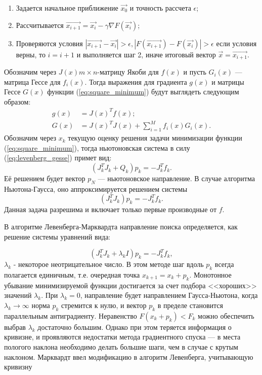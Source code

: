 \begin{enumerate}
 \item Задается начальное приближение $\vec{x_0}$ и точность рассчета $\epsilon$;
 \item Рассчитывается $ \vec{x_{i+1}} =  \vec{x_{i}} - \gamma \nabla F(\vec{x_{i}}) $;
 \item Проверяются условия $\left| \vec{x_{i+1}} - \vec{x_{i}} \right| > \epsilon, \left| F(\vec{x_{i+1}}) - F(\vec{x_{i}}) \right| > \epsilon $ если условия верны, то $i = i + 1$ 
 и выполняется шаг 2, иначе итоговый вектор $ \vec{x} = \vec{x_{i+1}} $.
\end{enumerate}
Обозначим через $J(x) m \times n$-матрицу Якоби для $f(x)$ и пусть $G_i(x)$ --- 
матрица Гессе для $f_i(x)$. Тогда выражения для градиента $g(x)$ и матрицы Гессе $G(x)$ функции
(\ref{eq:square_minimum}) будут выглядеть следующим образом:
\begin{equation}
\begin{split}
 g(x) &= J(x)^T f(x); \\
 G(x) &= J(x)^T J(x) + \displaystyle \sum_{i=1}^M f_i(x) G_i(x).
\end{split}
 \label{eq:levenberg_gesse}
\end{equation}
Обозначим через $x_k$ текущую оценку решения задачи минимизации функции (\ref{eq:square_minimum}),
тогда ньютоновская система в силу (\ref{eq:levenberg_gesse}) примет вид:
\begin{equation}
 \left(J^T_k J_k + Q_k\right) p_k = -J^T_k f_k.
\end{equation}
Её решением будет вектор $p_N$ --- ньютоновское направление. В случае алгоритма Ньютона-Гаусса, оно аппроксимируется  решением системы 
\begin{equation}
 (J^T_k J_k ) p_k = -J^T_k f_k.
\end{equation}
Данная задача разрешима и включает только первые производные от $f$.

В алгоритме Левенберга-Марквардта направление поиска 
определяется, как решение системы уравнений вида:

\begin{equation}
 (J^T_k J_k + \lambda_k I) p_k = -J^T_k f_k,
\end{equation}
$\lambda_k$ - некоторое неотрицательное число. В этом методе шаг вдоль $p_k$ всегда 
полагается единичным, т.е. очередная точка $x_{k+1} = x_k + p_k$. Монотонное убывание минимизируемой
функции достигается за счет подбора <<хороших>> значений $\lambda_k$. При $\lambda_k = 0$, направление будет 
направлением Гаусса-Ньютона, когда $\lambda_k \to \infty$ норма $p_k$ стремится к нулю, и вектор
$p_k$ в пределе становится параллельным антиградиенту. Неравенство $F (x_k + p_k) < F_k$ можно обеспечить
выбрав $\lambda_k$ достаточно большим. Однако при этом теряется информация о кривизне, и проявляются
недостатки метода градиентного спуска --- в места пологого наклона необходимо делать большие шаги, чем в случае
с крутым наклоном. Марквардт ввел модификацию в алгоритм Левенберга, учитывающую кривизну

